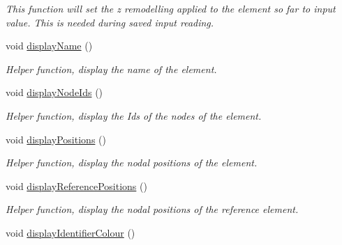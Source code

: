 \begin{DoxyCompactItemize}
\begin{DoxyCompactList}\small\item\em This function will set the z remodelling applied to the element so far to input value. This is needed during saved input reading. \end{DoxyCompactList}\item 
void \hyperlink{classShapeBase_ab8a7323c50767ecdc82d8d8ce411b264}{display\+Name} ()
\begin{DoxyCompactList}\small\item\em Helper function, display the name of the element. \end{DoxyCompactList}\item 
\hypertarget{classShapeBase_a324f8fd5dd90c14b621b2f2ee3ec98db}{}void \hyperlink{classShapeBase_a324f8fd5dd90c14b621b2f2ee3ec98db}{display\+Node\+Ids} ()\label{classShapeBase_a324f8fd5dd90c14b621b2f2ee3ec98db}

\begin{DoxyCompactList}\small\item\em Helper function, display the Ids of the nodes of the element. \end{DoxyCompactList}\item 
\hypertarget{classShapeBase_aca4d0f70caf459dc93f914ef7fc2a053}{}void \hyperlink{classShapeBase_aca4d0f70caf459dc93f914ef7fc2a053}{display\+Positions} ()\label{classShapeBase_aca4d0f70caf459dc93f914ef7fc2a053}

\begin{DoxyCompactList}\small\item\em Helper function, display the nodal positions of the element. \end{DoxyCompactList}\item 
\hypertarget{classShapeBase_af2d221cf63220dad3ecf139ffa164698}{}void \hyperlink{classShapeBase_af2d221cf63220dad3ecf139ffa164698}{display\+Reference\+Positions} ()\label{classShapeBase_af2d221cf63220dad3ecf139ffa164698}

\begin{DoxyCompactList}\small\item\em Helper function, display the nodal positions of the reference element. \end{DoxyCompactList}\item 
\hypertarget{classShapeBase_aba6bb76d8adffaeb7ad36cce8a3f17ab}{}void \hyperlink{classShapeBase_aba6bb76d8adffaeb7ad36cce8a3f17ab}{display\+Identifier\+Colour} ()\label{classShapeBase_aba6bb76d8adffaeb7ad36cce8a3f17ab}


\end{DoxyCompactItemize}

